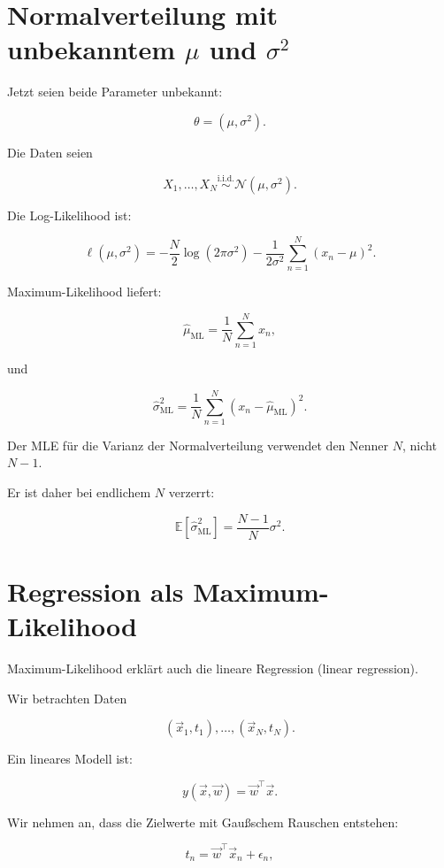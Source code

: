 \section{Normalverteilung mit unbekanntem \(\mu\) und \(\sigma^2\)}

Jetzt seien beide Parameter unbekannt:

\[
    \theta = (\mu,\sigma^2).
\]

Die Daten seien

\[
    X_1,\dots,X_N
    \overset{\mathrm{i.i.d.}}{\sim}
    \mathcal{N}(\mu,\sigma^2).
\]

Die Log-Likelihood ist:

\[
    \ell(\mu,\sigma^2)
    =
    -\frac{N}{2}\log(2\pi\sigma^2)
    -
    \frac{1}{2\sigma^2}
    \sum_{n=1}^{N}
    (x_n-\mu)^2.
\]

Maximum-Likelihood liefert:

\[
    \hat{\mu}_{\mathrm{ML}}
    =
    \frac{1}{N}
    \sum_{n=1}^{N}
    x_n,
\]

und

\[
    \hat{\sigma}_{\mathrm{ML}}^2
    =
    \frac{1}{N}
    \sum_{n=1}^{N}
    (x_n-\hat{\mu}_{\mathrm{ML}})^2.
\]

\begin{notebox}
Der MLE für die Varianz der Normalverteilung verwendet den Nenner \(N\), nicht \(N-1\).

Er ist daher bei endlichem \(N\) verzerrt:

\[
    \mathbb{E}[\hat{\sigma}_{\mathrm{ML}}^2]
    =
    \frac{N-1}{N}
    \sigma^2.
\]
\end{notebox}

\section{Regression als Maximum-Likelihood}

Maximum-Likelihood erklärt auch die lineare Regression (linear regression).

Wir betrachten Daten

\[
    (\vec{x}_1,t_1),\dots,(\vec{x}_N,t_N).
\]

Ein lineares Modell ist:

\[
    y(\vec{x},\vec{w})
    =
    \vec{w}^{\top}\vec{x}.
\]

Wir nehmen an, dass die Zielwerte mit Gaußschem Rauschen entstehen:

\[
    t_n
    =
    \vec{w}^{\top}\vec{x}_n
    +
    \epsilon_n,
\]

